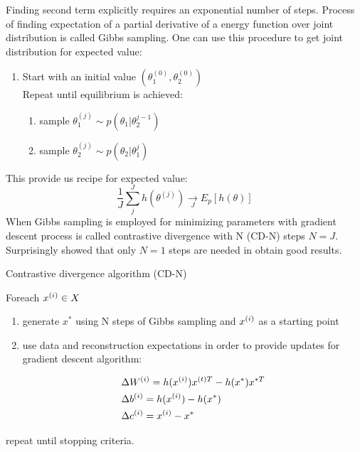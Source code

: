 Finding second term explicitly requires an exponential number of steps. Process of finding expectation of a partial derivative of a energy function over joint distribution is called Gibbs sampling. One can use this procedure to get joint distribution for expected value:

\begin{enumerate}
	\item Start with an initial value $(\theta_1^{(0)}, \theta_2^{(0)})$ \\

Repeat until equilibrium is achieved:
\begin{indenva}
\begin{enumerate}
	\item sample $\theta_1^{(j)} \sim p(\theta_1|\theta_2^{j-1})$
	\item sample $\theta_2^{(j)} \sim p(\theta_2|\theta_1^{j})$
\end{enumerate}
\end{indenva}
\end{enumerate}

This provide us recipe for expected value:
\begin{equation}
	\frac{1}{J} \sum_j^J h(\theta^{(j)}) \underset{J}\rightarrow E_p \left[ h(\theta) \right]
\end{equation}
When Gibbs sampling is employed for minimizing parameters with gradient descent process is called contrastive divergence with N (CD-N) steps $N=J$. Surprisingly \textcite{hinton_fast_2006} showed that only $N=1$ steps are needed in obtain good results.

\begin{algorithm} Contrastive divergence algorithm (CD-N)
\item Foreach $x^{(i)} \in X$ \\

\begin{indenva}
\begin{enumerate}
	\item generate $x^{*}$ using N steps of Gibbs sampling and $x^{(i)}$ as a starting point
	\item use data and reconstruction expectations in order to provide updates for gradient descent algorithm:
\begin{indenvb}
	\begin{align}
		&\Delta W^{(i)} =  h(x^{(i)})x^{(t)T} - h(x^*)x^{*T} \\
		&\Delta b^{(i)} =  h(x^{(i)}) - h(x^*) \\
		&\Delta c^{(i)} =  x^{(i)} - x^*
	\end{align}
\end{indenvb}
\end{enumerate}
\end{indenva}
\item repeat until stopping criteria.
\end{algorithm}


